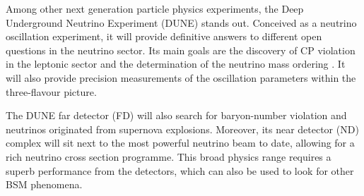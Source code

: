 Among other next generation particle physics experiments, the Deep Underground Neutrino Experiment (DUNE) stands out. Conceived as a neutrino oscillation experiment, it will provide definitive answers to different open questions in the neutrino sector. Its main goals are the discovery of CP violation in the leptonic sector and the determination of the neutrino mass ordering \cite{DUNE2020TDR1}. It will also provide precision measurements of the oscillation parameters within the three-flavour picture.

The DUNE far detector (FD) will also search for baryon-number violation and neutrinos originated from supernova explosions. Moreover, its near detector (ND) complex will sit next to the most powerful neutrino beam to date, allowing for a rich neutrino cross section programme. This broad physics range requires a superb performance from the detectors, which can also be used to look for other BSM phenomena.

\begin{comment}
In this thesis, I explore three different aspects of DUNE. Focusing on the data acquisition system of the far detector, I start by proposing a method to enhance the sensitivity of the online processing to low energy events. The idea is to modify the processing chain in order to have more information available to form trigger decisions. I motivate this new approach using both ProtoDUNE data and Monte Carlo (MC) samples, as well as with the results from a test in a real detector setup.

Then, I investigate the potential of detecting neutrino fluxes from DM annihilations inside the Sun with DUNE. Although this is the territory of the large volume neutrino telescopes, a detector with the high resolution and pointing capabilities of the DUNE FD can provide complementary information in certain regimes. I present here the results of a preliminary analysis, showing the projected sensitivities for the general case and two particular DM scenarios.

Finally, I discuss my work on the reconstruction of ND-GAr, the gaseous argon component of the DUNE ND. These efforts were focused towards the development of the particle identification strategy in the detector. Following a series of additions and upgrades in the reconstruction, I make use of that to perform the first event selection studies with fully reconstructed events in this detector.
\end{comment}

